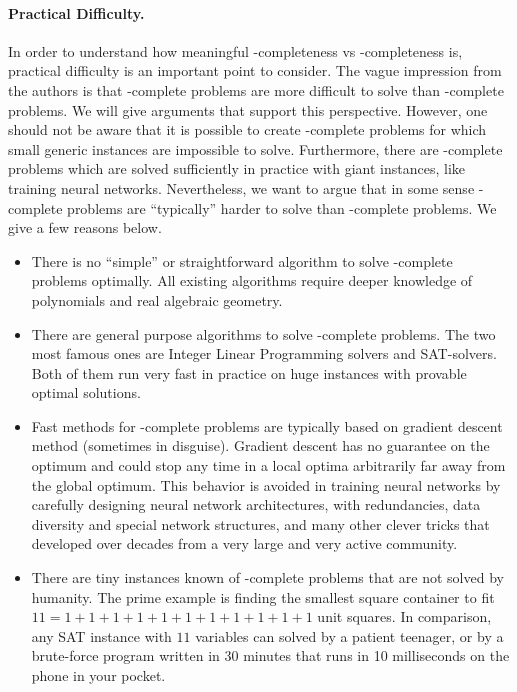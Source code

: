 \documentclass{article}
\begin{document}
\paragraph{Practical Difficulty.}
    In order to understand how meaningful \ER-completeness vs \NP-completeness is, practical difficulty is an important point to consider.
    The vague impression from the authors is that \ER-complete problems are more difficult to solve than \NP-complete problems. 
    We will give arguments that support this perspective.
    However, one should not be aware that it is possible to create \NP-complete problems for which small generic instances are impossible to solve.
    Furthermore, there are \ER-complete problems which are solved sufficiently in practice with giant instances, like training neural networks.
    Nevertheless, we want to argue that in some sense \ER-complete problems are ``typically'' harder to solve than \NP-complete problems.
    We give a few reasons below.
    \begin{itemize}
        \item There is no ``simple'' or straightforward algorithm to solve \ER-complete problems optimally.
        All existing algorithms require deeper knowledge of polynomials and real algebraic geometry.
        \item There are general purpose algorithms to solve \NP-complete problems. The two most famous ones are Integer Linear Programming solvers and SAT-solvers.
        Both of them run very fast in practice on huge instances with provable optimal solutions.
        \item Fast methods for \ER-complete problems are typically based on gradient descent method (sometimes in disguise). 
        Gradient descent has no guarantee on the optimum and could stop any time in a local optima arbitrarily far away from the global optimum.
        This behavior is avoided in training neural networks by carefully designing neural network architectures, with redundancies, data diversity and special network structures, and many other clever tricks that developed over decades from a very large and very active community. 
        \item There are tiny instances known of \ER-complete problems that are not solved by humanity.
        The prime example is finding the smallest square container to fit $11 = 1 + 1 + 1 + 1 + 1 + 1 + 1 + 1 + 1 + 1 + 1$ unit squares.
        In comparison, any SAT instance with $11$ variables can solved by a patient teenager, or by a brute-force program written in 30 minutes that runs in 10 milliseconds on the phone in your pocket.
    \end{itemize}
\end{document}
